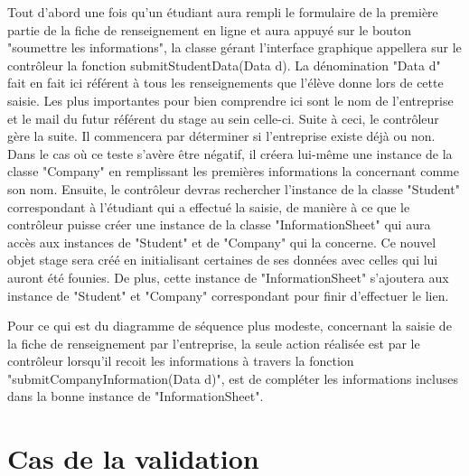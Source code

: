\documentclass{scrreprt}
\begin{document}
	Tout d'abord une fois qu'un étudiant aura rempli le formulaire de la première partie de la fiche de renseignement en ligne et aura
appuyé sur le bouton "soumettre les informations", la classe gérant l'interface graphique appellera sur le contrôleur la fonction 
submitStudentData(Data d). La dénomination "Data d" fait en fait ici référent à tous les renseignements que l'élève donne lors de 
cette saisie. Les plus importantes pour bien comprendre ici sont le nom de l'entreprise et le mail du futur référent du stage au sein
celle-ci. Suite à ceci, le contrôleur gère la suite. Il commencera par déterminer si l'entreprise existe déjà ou non. Dans le cas où
ce teste s'avère être négatif, il créera lui-même une instance de la classe "Company" en remplissant les premières informations la 
concernant comme son nom. Ensuite, le contrôleur devras rechercher l'instance de la classe "Student" correspondant à l'étudiant qui
a effectué la saisie, de manière à ce que le contrôleur puisse créer une instance de la classe "InformationSheet" qui aura accès aux instances
de "Student" et de "Company" qui la concerne. Ce nouvel objet stage sera créé en initialisant certaines de ses données avec celles qui lui
auront été founies. De plus, cette instance de "InformationSheet" s'ajoutera aux instance de "Student" et "Company" correspondant pour finir 
d'effectuer le lien.

\newpage

	Pour ce qui est du diagramme de séquence plus modeste, concernant la saisie de la fiche de renseignement par l'entreprise, 
la seule action réalisée est par le contrôleur lorsqu'il recoit les informations à travers la fonction "submitCompanyInformation(Data d)",
est de compléter les informations incluses dans la bonne instance de "InformationSheet".


\newpage
\section{Cas de la validation}
\end{document}
